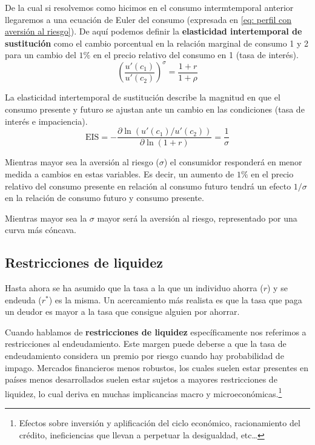 De la cual si resolvemos como hicimos en el consumo intermtemporal anterior llegaremos a una ecuación de Euler del consumo (expresada en \ref{eq: perfil con aversión al riesgo}). De aquí podemos definir la \textbf{elasticidad intertemporal de sustitución} como el cambio porcentual en la relación marginal de consumo 1 y 2 para un cambio del $1\%$ en el precio relativo del consumo en 1 (tasa de interés). 
\begin{equation}
    \left( \frac{u'(c_1)}{u'(c_2)} \right) ^\sigma=  \frac{1+r}{1+\rho}  \label{eq: perfil con aversión al riesgo}
\end{equation}

La elasticidad intertemporal de sustitución describe la magnitud en que el consumo presente y futuro se ajustan ante un cambio en las condiciones (tasa de interés e impaciencia). 
\begin{equation}
    \text{EIS} = - \frac{\partial \ln (u'(c_1)/u'(c_2))}{\partial \ln (1+r)} = \frac{1}{\sigma}
\end{equation}

Mientras mayor sea la aversión al riesgo ($\sigma$) el consumidor responderá en menor medida a cambios en estas variables. Es decir, un aumento de $1\%$ en el precio relativo del consumo presente en relación al consumo futuro tendrá un efecto $1/\sigma$ en la relación de consumo futuro y consumo presente.

Mientras mayor sea la $\sigma$ mayor será la aversión al riesgo, representado por una curva más cóncava. 

\subsection{Restricciones de liquidez}

Hasta ahora se ha asumido que la tasa a la que un individuo ahorra ($r$) y se endeuda ($r^*$) es la misma. Un acercamiento más realista es que la tasa que paga un deudor es mayor a la tasa que consigue alguien por ahorrar. 

Cuando hablamos de \textbf{restricciones de liquidez} específicamente nos referimos a restricciones al endeudamiento. Este margen puede deberse a que la tasa de endeudamiento considera un premio por riesgo cuando hay probabilidad de impago. Mercados financieros menos robustos, los cuales suelen estar presentes en países menos desarrollados suelen estar sujetos a mayores restricciones de liquidez, lo cual deriva en muchas implicancias macro y microeconómicas.\footnote{Efectos sobre inversión y aplificación del ciclo económico, racionamiento del crédito, ineficiencias que llevan a perpetuar la desigualdad, etc\ldots}

